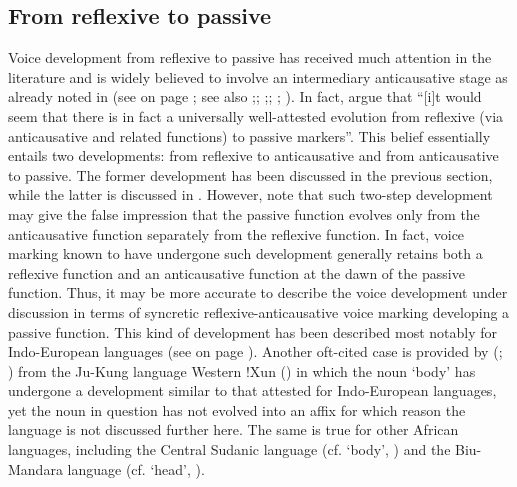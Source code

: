 \subsection{From reflexive to passive} \label{diachrony:refl2pass}
Voice development from reflexive to passive has received much attention in the literature and is widely believed to involve an intermediary anticausative stage as already noted in  (see  on page \pageref{fig:ch7:unidirectional}; see also \citealt[44f.]{haspelmath:1990};; \citealt[197f.]{kemmer:1993};; \citealt[253]{heine:kuteva:2002}; \citealt[225f.]{zuniga:kittila:2019}). In fact, \citet[205]{heine:miyashita:2008} argue that “[i]t would seem that there is in fact a universally well-attested evolution from reflexive (via anticausative and related functions) to passive markers”. This belief essentially entails two developments: from reflexive to anticausative and from anticausative to passive. The former development has been discussed in the previous section, while the latter is discussed in . However, note that such two-step development may give the false impression that the passive function evolves only from the anticausative function separately from the reflexive function. In fact, voice marking known to have undergone such development generally retains both a reflexive function and an anticausative function at the dawn of the passive function. Thus, it may be more accurate to describe the voice development under discussion in terms of syncretic reflexive-anticausative voice marking developing a passive function. This kind of development has been described most notably for Indo-European languages (see  on page \pageref{tab:ch7:syncretism-ie}). Another oft-cited case is provided by \citeauthor{heine:kuteva:2002} (\citeyear[44]{heine:kuteva:2002}; \citeyear[110ff.]{heine:kuteva:2007}) from the Ju-Kung language Western !Xun () in which the noun  ‘body’ has undergone a development similar to that attested for Indo-European languages, yet the noun in question has not evolved into an affix for which reason the language is not discussed further here. The same is true for other African languages, including the Central Sudanic language  (cf.  ‘body’, \citealt[203f.]{heine:miyashita:2008}) and the Biu-Mandara language  (cf.  ‘head’, \citealt[44]{haspelmath:1990}).

